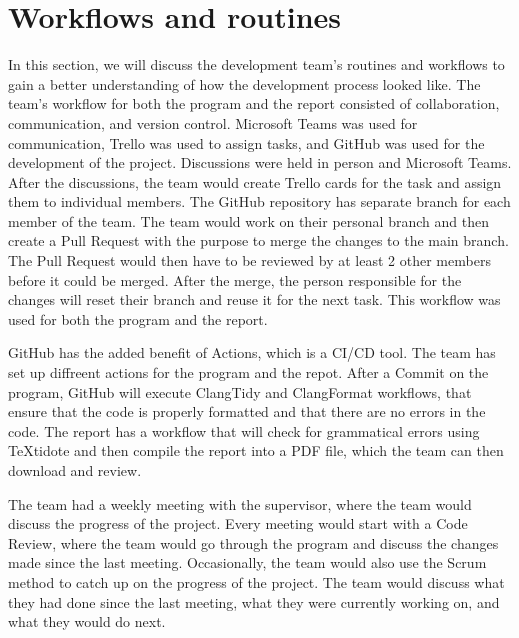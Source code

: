\section{Workflows and routines}\label{sec:workflows-and-routines}

In this section, we will discuss the development team's routines and workflows to gain a better understanding of how
the development process looked like.
The team's workflow for both the program and the report consisted of collaboration, communication, and version control.
Microsoft Teams was used for communication, Trello was used to assign tasks, and GitHub was used for the development of
the project.
Discussions were held in person and Microsoft Teams.
After the discussions, the team would create Trello cards for the task and assign them to individual members.
The GitHub repository has separate branch for each member of the team.
The team would work on their personal branch and then create a Pull Request with the purpose to merge the changes to the
main branch.
The Pull Request would then have to be reviewed by at least 2 other members before it could be merged.
After the merge, the person responsible for the changes will reset their branch and reuse it for the next task.
This workflow was used for both the program and the report.

GitHub has the added benefit of Actions, which is a CI/CD tool.
The team has set up diffreent actions for the program and the repot.
After a Commit on the program, GitHub will execute ClangTidy and ClangFormat workflows, that ensure that the code is
properly formatted and that there are no errors in the code.
The report has a workflow that will check for grammatical errors using TeXtidote and then compile the report into a PDF
file, which the team can then download and review.

The team had a weekly meeting with the supervisor, where the team would discuss the progress of the project.
Every meeting would start with a Code Review, where the team would go through the program and discuss the changes made
since the last meeting.
Occasionally, the team would also use the Scrum method to catch up on the progress of the project.
The team would discuss what they had done since the last meeting, what they were currently working on, and what they
would do next.
